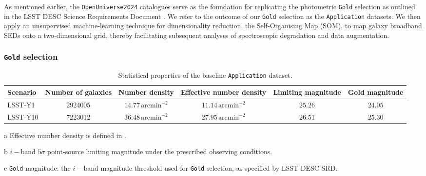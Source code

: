 As mentioned earlier, the \texttt{OpenUniverse2024} catalogues serve as the foundation for replicating the photometric \texttt{Gold} selection as outlined in the LSST DESC Science Requirements Document \citep[SRD;][]{2018arXiv180901669T}. We refer to the outcome of our \texttt{Gold} selection as the \texttt{Application} datasets. We then apply an unsupervised machine‐learning technique for dimensionality reduction, the Self‐Organising Map (SOM), to map galaxy broadband SEDs onto a two‐dimensional grid, thereby facilitating subsequent analyses of spectroscopic degradation and data augmentation.

\subsubsection{\texttt{Gold} selection}

\begin{table}
  \centering
  \begin{threeparttable}
    \caption{Statistical properties of the baseline \texttt{Application} dataset.}
    \label{tab:1}
    \begin{tabular}{lccccc}
      \hline
      Scenario & Number of galaxies & Number density & Effective number density\tnote{a} & Limiting magnitude\tnote{b} & Gold magnitude\tnote{c}  \\
      \hline
      LSST-Y1 & 2924005 & \(14.77 \, \mathrm{arcmin}^{-2}\) & \(11.14 \, \mathrm{arcmin}^{-2}\) & \(25.26 \) & \(24.05 \) \\
      LSST-Y10 & 7223012 & \(36.48 \, \mathrm{arcmin}^{-2}\) & \(27.95 \, \mathrm{arcmin}^{-2}\) & \(26.51 \) & \(25.30 \) \\
      \hline
    \end{tabular}
    \begin{tablenotes}
      \item[a] Effective number density is defined in \cite{2013MNRAS.434.2121C}.
      \item[b] \(i-\)band \(5\sigma\) point-source limiting magnitude under the prescribed observing conditions.
      \item[c] \texttt{Gold} magnitude: the \(i-\)band magnitude threshold used for \texttt{Gold} selection, as specified by LSST DESC SRD.
    \end{tablenotes}
  \end{threeparttable}
\end{table}

